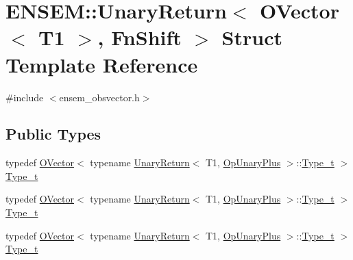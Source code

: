 \hypertarget{structENSEM_1_1UnaryReturn_3_01OVector_3_01T1_01_4_00_01FnShift_01_4}{}\section{E\+N\+S\+EM\+:\+:Unary\+Return$<$ O\+Vector$<$ T1 $>$, Fn\+Shift $>$ Struct Template Reference}
\label{structENSEM_1_1UnaryReturn_3_01OVector_3_01T1_01_4_00_01FnShift_01_4}


{\ttfamily \#include $<$ensem\+\_\+obsvector.\+h$>$}

\subsection*{Public Types}
\begin{DoxyCompactItemize}
\item 
typedef \mbox{\hyperlink{classENSEM_1_1OVector}{O\+Vector}}$<$ typename \mbox{\hyperlink{structENSEM_1_1UnaryReturn}{Unary\+Return}}$<$ T1, \mbox{\hyperlink{structENSEM_1_1OpUnaryPlus}{Op\+Unary\+Plus}} $>$\+::\mbox{\hyperlink{structENSEM_1_1UnaryReturn_3_01OVector_3_01T1_01_4_00_01FnShift_01_4_a45f08020845d964612b7c715afabda12}{Type\+\_\+t}} $>$ \mbox{\hyperlink{structENSEM_1_1UnaryReturn_3_01OVector_3_01T1_01_4_00_01FnShift_01_4_a45f08020845d964612b7c715afabda12}{Type\+\_\+t}}
\item 
typedef \mbox{\hyperlink{classENSEM_1_1OVector}{O\+Vector}}$<$ typename \mbox{\hyperlink{structENSEM_1_1UnaryReturn}{Unary\+Return}}$<$ T1, \mbox{\hyperlink{structENSEM_1_1OpUnaryPlus}{Op\+Unary\+Plus}} $>$\+::\mbox{\hyperlink{structENSEM_1_1UnaryReturn_3_01OVector_3_01T1_01_4_00_01FnShift_01_4_a45f08020845d964612b7c715afabda12}{Type\+\_\+t}} $>$ \mbox{\hyperlink{structENSEM_1_1UnaryReturn_3_01OVector_3_01T1_01_4_00_01FnShift_01_4_a45f08020845d964612b7c715afabda12}{Type\+\_\+t}}
\item 
typedef \mbox{\hyperlink{classENSEM_1_1OVector}{O\+Vector}}$<$ typename \mbox{\hyperlink{structENSEM_1_1UnaryReturn}{Unary\+Return}}$<$ T1, \mbox{\hyperlink{structENSEM_1_1OpUnaryPlus}{Op\+Unary\+Plus}} $>$\+::\mbox{\hyperlink{structENSEM_1_1UnaryReturn_3_01OVector_3_01T1_01_4_00_01FnShift_01_4_a45f08020845d964612b7c715afabda12}{Type\+\_\+t}} $>$ \mbox{\hyperlink{structENSEM_1_1UnaryReturn_3_01OVector_3_01T1_01_4_00_01FnShift_01_4_a45f08020845d964612b7c715afabda12}{Type\+\_\+t}}
\end{DoxyCompactItemize}


